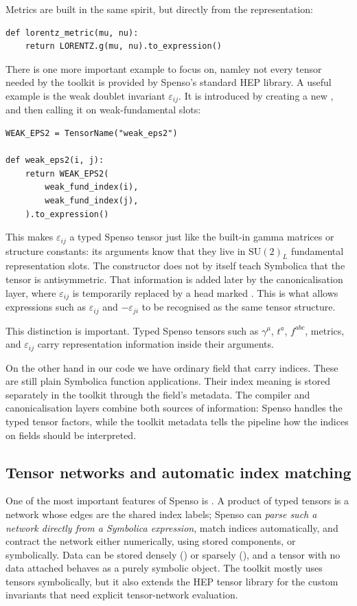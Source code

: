 Metrics are built in the same spirit, but directly from the representation:
\begin{verbatim}
def lorentz_metric(mu, nu):
    return LORENTZ.g(mu, nu).to_expression()
\end{verbatim}

There is one more important example to focus on, namley not every tensor needed by the toolkit is provided by Spenso's standard HEP library. A useful example is the weak doublet invariant \(\varepsilon_{ij}\). It is introduced by creating a new , and then calling it on weak-fundamental slots:
\begin{verbatim}
WEAK_EPS2 = TensorName("weak_eps2")

def weak_eps2(i, j):
    return WEAK_EPS2(
        weak_fund_index(i),
        weak_fund_index(j),
    ).to_expression()
\end{verbatim}

This makes \(\varepsilon_{ij}\) a typed Spenso tensor just like the built-in gamma matrices or structure constants: its arguments know that they live in \(\mathrm{SU}(2)_L\) fundamental representation slots. The constructor does not by itself teach Symbolica that the tensor is antisymmetric. That information is added later by the canonicalisation layer, where \(\varepsilon_{ij}\) is temporarily replaced by a head marked . This is what allows expressions such as \(\varepsilon_{ij}\) and \(-\varepsilon_{ji}\) to be recognised as the same tensor structure.

This distinction is important. Typed Spenso tensors such as \(\gamma^\mu\), \(t^a\), \(f^{abc}\), metrics, and \(\varepsilon_{ij}\) carry representation information inside their arguments.

On the other hand in our code we have ordinary field  that carry indices. These are still plain Symbolica function applications. Their index meaning is stored separately in the toolkit through the field's  metadata. The compiler and canonicalisation layers combine both sources of information: Spenso handles the typed tensor factors, while the toolkit metadata tells the pipeline how the indices on fields should be interpreted.

\subsection*{Tensor networks and automatic index matching}

One of the most important features of Spenso is . A product of typed tensors is a network whose edges are the shared index labels; Spenso can \emph{parse such a network directly from a Symbolica expression}, match indices automatically, and contract the network either numerically, using stored components, or symbolically. Data can be stored densely () or sparsely (), and a tensor with no data attached behaves as a purely symbolic object. The toolkit mostly uses tensors symbolically, but it also extends the HEP tensor library for the custom invariants that need explicit tensor-network evaluation.

